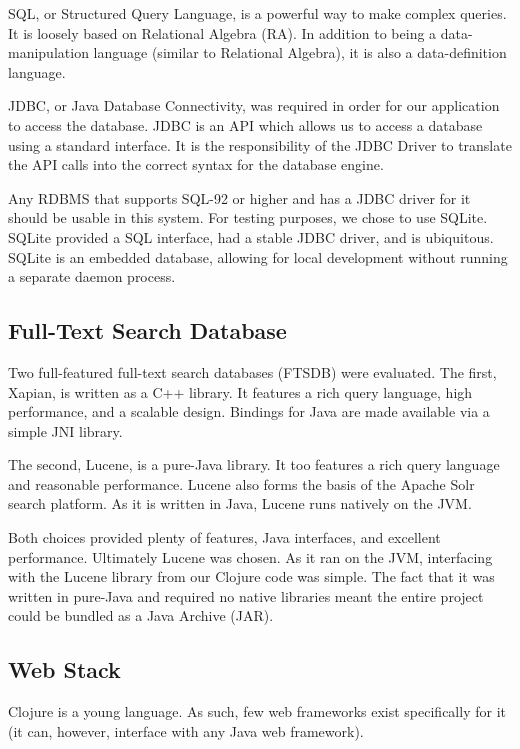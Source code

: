 \documentclass[12pt,letterpaper,oneside,notitlepage]{report}
\theoremstyle{definition}
\begin{document}
        SQL, or Structured Query Language, is a powerful way to make complex queries.  It is loosely based on Relational Algebra (RA)\cite[p.~243]{dbsys-06}.  In addition to being a data-manipulation language (similar to Relational Algebra), it is also a data-definition language.
        
        JDBC, or Java Database Connectivity, was required in order for our application to access the database.  JDBC is an API which allows us to access a database using a standard interface.  It is the responsibility of the JDBC Driver to translate the API calls into the correct syntax for the database engine.
        
        Any RDBMS that supports SQL-92 or higher and has a JDBC driver for it should be usable in this system.  For testing purposes, we chose to use SQLite.  SQLite provided a SQL interface, had a stable JDBC driver, and is ubiquitous.  SQLite is an embedded database, allowing for local development without running a separate daemon process.
      
      \subsection{Full-Text Search Database}
        Two full-featured full-text search databases (FTSDB) were evaluated.  The first, Xapian, is written as a C++ library.  It features a rich query language, high performance, and a scalable design\cite{xapian}.  Bindings for Java are made available via a simple JNI library.
        
        The second, Lucene, is a pure-Java library.  It too features a rich query language and reasonable performance.  Lucene also forms the basis of the Apache Solr search platform.  As it is written in Java, Lucene runs natively on the JVM.
        
        Both choices provided plenty of features, Java interfaces, and excellent performance.  Ultimately Lucene was chosen.  As it ran on the JVM, interfacing with the Lucene library from our Clojure code was simple.  The fact that it was written in pure-Java and required no native libraries meant the entire project could be bundled as a Java Archive (JAR).
      
      \subsection{Web Stack}
        Clojure is a young language.  As such, few web frameworks exist specifically for it (it can, however, interface with any Java web framework).  
        
\end{document}
